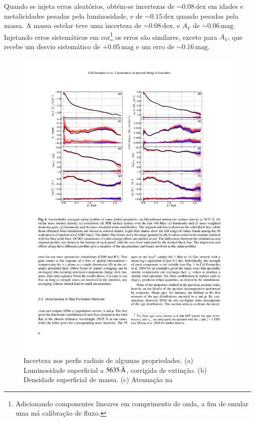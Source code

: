 Quando se injeta erros aleatórios, obtém-se incertezas de $\sim
0.08\,\mathrm{dex}$ em idades e metalicidades pesadas pela luminosidade, e de
$\sim 0.15\,\mathrm{dex}$ quando pesadas pela massa. A massa estelar teve uma
incerteza de $\sim 0.08\,\mathrm{dex}$, e $A_V$ de $\sim 0.06\,\mathrm{mag}$.
Injetando erros sistemáticos em cor\footnote{Adicionando componentes lineares em
comprimento de onda, a fim de emular uma má calibração de fluxo.} os erros são
similares, exceto para $A_V$, que recebe um desvio sistemático de
$+0.05\,\mathrm{mag}$ e um erro de $\sim 0.16\,\mathrm{mag}$.

\begin{figure}
	\includegraphics[width=1.0\columnwidth]{figuras/resolving2}
	\caption[Incerteza nos perfis radiais] {Incerteza nos perfis radiais de
	algumas propriedades. (a) Luminosidade superficial a $5635\,\text{\normalfont\AA}$,
	corrigida de extinção. (b) Densidade superficial de massa. (c) Atenuação na
}
\end{figure}
